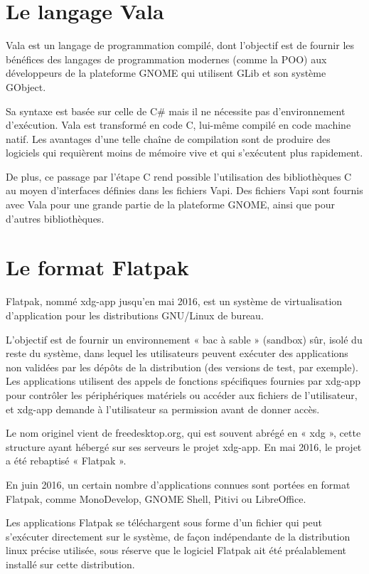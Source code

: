 \documentclass[12pt]{report}
\begin{document}
\section{Le langage Vala}
Vala est un langage de programmation compilé, dont l'objectif est de
fournir les bénéfices des langages de programmation modernes (comme la
POO) aux développeurs de la plateforme GNOME qui utilisent GLib et son
système GObject.

Sa syntaxe est basée sur celle de C\# mais il ne nécessite pas
d'environnement d'exécution. Vala est transformé en code C, lui-même
compilé en code machine natif. Les avantages d'une telle chaîne de
compilation sont de produire des logiciels qui requièrent moins de
mémoire vive et qui s'exécutent plus rapidement.

De plus, ce passage par l'étape C rend possible l'utilisation des
bibliothèques C au moyen d'interfaces définies dans les fichiers
Vapi. Des fichiers Vapi sont fournis avec Vala pour une grande partie
de la plateforme GNOME, ainsi que pour d'autres bibliothèques.

\section{Le format Flatpak}
Flatpak, nommé xdg-app jusqu’en mai 2016, est un système de
virtualisation d’application pour les distributions GNU/Linux de
bureau.

L'objectif est de fournir un environnement « bac à sable » (sandbox)
sûr, isolé du reste du système, dans lequel les utilisateurs peuvent
exécuter des applications non validées par les dépôts de la
distribution (des versions de test, par exemple). Les applications
utilisent des appels de fonctions spécifiques fournies par xdg-app
pour contrôler les périphériques matériels ou accéder aux fichiers de
l'utilisateur, et xdg-app demande à l'utilisateur sa permission avant
de donner accès.

Le nom originel vient de freedesktop.org, qui est souvent abrégé en «
xdg », cette structure ayant hébergé sur ses serveurs le projet
xdg-app. En mai 2016, le projet a été rebaptisé « Flatpak ».

En juin 2016, un certain nombre d'applications connues sont portées en
format Flatpak, comme MonoDevelop, GNOME Shell, Pitivi ou LibreOffice.

Les applications Flatpak se téléchargent sous forme d'un fichier qui
peut s’exécuter directement sur le système, de façon indépendante de
la distribution linux précise utilisée, sous réserve que le logiciel
Flatpak ait été préalablement installé sur cette distribution.
\end{document}
